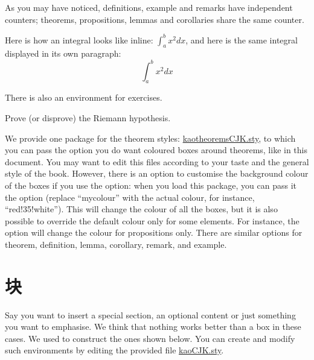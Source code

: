 As you may have noticed, definitions, example and remarks have
independent counters; theorems, propositions, lemmas and corollaries
share the same counter.

\begin{remark}
	Here is how an integral looks like inline: $\int_{a}^{b} x^2 dx$, and
	here is the same integral displayed in its own paragraph:
	\[\int_{a}^{b} x^2 dx\]
\end{remark}

There is also an environment for exercises.

\begin{exercise}
	Prove (or disprove) the Riemann hypothesis.
\end{exercise}

We provide one package for the theorem styles:
\href{kaotheoremsCJK.sty}{kaotheoremsCJK.sty}, to which you can pass the
 option you do want coloured boxes around theorems, like
in this document. You may want to edit this files according to your taste
and the general style of the book. However, there is an option to
customise the background colour of the boxes if you use the
 option: when you load this package, you can pass it the
 option (replace \enquote{mycolour} with the
actual colour, for instance, \enquote{red!35!white}). This will change
the colour of all the boxes, but it is also possible to override the
default colour only for some elements. For instance, the
 option will change the colour
for propositions only. There are similar options for theorem,
definition, lemma, corollary, remark, and example.

\section[块]{块
  }

Say you want to insert a special section, an optional content or just
something you want to emphasise. We think that nothing works better than
a box in these cases. We used  to construct the ones
shown below. You can create and modify such environments by editing the
provided file \href{kaoCJK.sty}{kaoCJK.sty}.

